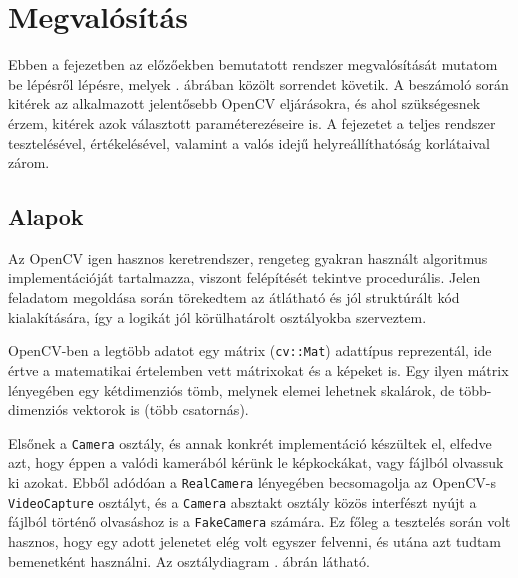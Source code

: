 \chapter{Megvalósítás}


Ebben a fejezetben az előzőekben bemutatott rendszer megvalósítását mutatom be lépésről lépésre, melyek . ábrában közölt sorrendet követik. A beszámoló során kitérek az alkalmazott jelentősebb OpenCV eljárásokra, és ahol szükségesnek érzem, kitérek azok választott paraméterezéseire is. A fejezetet a teljes rendszer tesztelésével, értékelésével, valamint a valós idejű helyreállíthatóság korlátaival zárom.


\section{Alapok}



Az OpenCV igen hasznos keretrendszer, rengeteg gyakran használt algoritmus implementációját tartalmazza, viszont felépítését tekintve procedurális. Jelen feladatom megoldása során törekedtem az átlátható és jól struktúrált kód kialakítására, így a logikát jól körülhatárolt osztályokba szerveztem.

OpenCV-ben a legtöbb adatot egy mátrix (\texttt{cv::Mat}) adattípus reprezentál, ide értve a matematikai értelemben vett mátrixokat és a képeket is. Egy ilyen mátrix lényegében egy kétdimenziós tömb, melynek elemei lehetnek skalárok, de több-dimenziós vektorok is (több csatornás).

Elsőnek a \texttt{Camera} osztály, és annak konkrét implementáció készültek el, elfedve azt, hogy éppen a valódi kamerából kérünk le képkockákat, vagy fájlból olvassuk ki azokat. Ebből adódóan a \texttt{RealCamera} lényegében becsomagolja az OpenCV-s \texttt{VideoCapture} osztályt, és a \texttt{Camera} absztakt osztály közös interfészt nyújt a fájlból történő olvasáshoz is a \texttt{FakeCamera} számára. Ez főleg a tesztelés során volt hasznos, hogy egy adott jelenetet elég volt egyszer felvenni, és utána azt tudtam bemenetként használni. Az osztálydiagram . ábrán látható.

